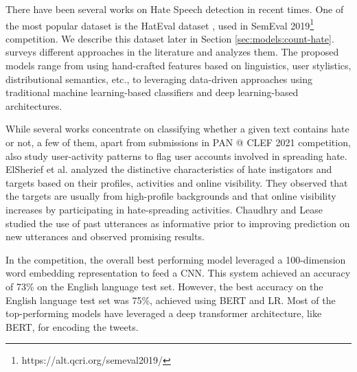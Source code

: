 
There have been several works on Hate Speech detection in recent times.
One of the most popular dataset is the HatEval dataset \cite{hateval}, used in SemEval 2019\footnote{https://alt.qcri.org/semeval2019/} competition. We describe this dataset later in Section \ref{sec:models:count-hate}.
\cite{methodsSurvey} surveys different approaches in the literature and analyzes them. The proposed models range from using hand-crafted features based on linguistics, user stylistics, distributional semantics, etc., to leveraging data-driven approaches using traditional machine learning-based classifiers and deep learning-based architectures. 

While several works concentrate on classifying whether a given text contains hate or not, a few of them, apart from submissions in PAN @ CLEF 2021 competition, also study user-activity patterns to flag user accounts involved in spreading hate. ElSherief et al. \cite{ElSherief} analyzed the distinctive characteristics of hate instigators and targets based on their profiles, activities and online visibility. They observed that the targets are usually from high-profile backgrounds and that online visibility increases by participating in hate-spreading activities. Chaudhry and Lease \cite{DBLP:Chaudhry} studied the use of past utterances as informative prior to improving prediction on new utterances and observed promising results.


In the competition, the overall best performing model \cite{overall_best} leveraged a 100-dimension word embedding representation to feed a \ac{CNN}.
This system achieved an accuracy of 73\% on the English language test set.
However, the best accuracy on the English language test set was 75\%, achieved using \ac{BERT} and \ac{LR}.
Most of the top-performing models have leveraged a deep transformer architecture, like \ac{BERT}, for encoding the tweets.



